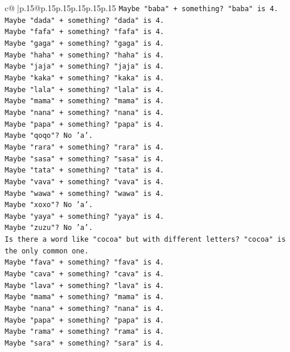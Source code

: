 \documentclass{article}
\begin{document}
{\begin{supertabular}{c@{$\;$}|p{.15\linewidth}@{}p{.15\linewidth}p{.15\linewidth}p{.15\linewidth}p{.15\linewidth}p{.15\linewidth}}
{{{\texttt{Maybe "baba" + something? "baba" is 4.} \\
\texttt{Maybe "dada" + something? "dada" is 4.} \\
\texttt{Maybe "fafa" + something? "fafa" is 4.} \\
\texttt{Maybe "gaga" + something? "gaga" is 4.} \\
\texttt{Maybe "haha" + something? "haha" is 4.} \\
\texttt{Maybe "jaja" + something? "jaja" is 4.} \\
\texttt{Maybe "kaka" + something? "kaka" is 4.} \\
\texttt{Maybe "lala" + something? "lala" is 4.} \\
\texttt{Maybe "mama" + something? "mama" is 4.} \\
\texttt{Maybe "nana" + something? "nana" is 4.} \\
\texttt{Maybe "papa" + something? "papa" is 4.} \\
\texttt{Maybe "qoqo"? No 'a'.} \\
\texttt{Maybe "rara" + something? "rara" is 4.} \\
\texttt{Maybe "sasa" + something? "sasa" is 4.} \\
\texttt{Maybe "tata" + something? "tata" is 4.} \\
\texttt{Maybe "vava" + something? "vava" is 4.} \\
\texttt{Maybe "wawa" + something? "wawa" is 4.} \\
\texttt{Maybe "xoxo"? No 'a'.} \\
\texttt{Maybe "yaya" + something? "yaya" is 4.} \\
\texttt{Maybe "zuzu"? No 'a'.} \\
\texttt{Is there a word like "cocoa" but with different letters? "cocoa" is the only common one.} \\
\texttt{Maybe "fava" + something? "fava" is 4.} \\
\texttt{Maybe "cava" + something? "cava" is 4.} \\
\texttt{Maybe "lava" + something? "lava" is 4.} \\
\texttt{Maybe "mama" + something? "mama" is 4.} \\
\texttt{Maybe "nana" + something? "nana" is 4.} \\
\texttt{Maybe "papa" + something? "papa" is 4.} \\
\texttt{Maybe "rama" + something? "rama" is 4.} \\
\texttt{Maybe "sara" + something? "sara" is 4.} \\
}}}
\end{supertabular}}
\end{document}
